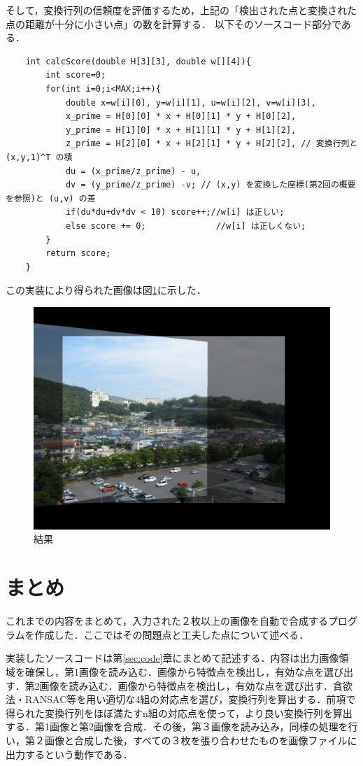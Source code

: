 \documentclass[11pt]{jarticle}
\begin{document}
そして，変換行列の信頼度を評価するため，上記の「検出された点と変換された点の距離が十分に小さい点」の数を計算する．
以下そのソースコード部分である．
\begin{verbatim}
    int calcScore(double H[3][3], double w[][4]){
        int score=0;
        for(int i=0;i<MAX;i++){
            double x=w[i][0], y=w[i][1], u=w[i][2], v=w[i][3],
            x_prime = H[0][0] * x + H[0][1] * y + H[0][2],
            y_prime = H[1][0] * x + H[1][1] * y + H[1][2],
            z_prime = H[2][0] * x + H[2][1] * y + H[2][2], // 変換行列と (x,y,1)^T の積
            du = (x_prime/z_prime) - u,
            dv = (y_prime/z_prime) -v; // (x,y) を変換した座標(第2回の概要を参照)と (u,v) の差
            if(du*du+dv*dv < 10) score++;//w[i] は正しい;
            else score += 0;              //w[i] は正しくない;
        }
        return score;
    }    
\end{verbatim}

この実装により得られた画像は図\ref{7-1.jpg}に示した．

\begin{figure}[ht]
    \centering
    \includegraphics[scale=.5]{7-1.jpg}
    \caption{結果}
    \label{7-1.jpg}
\end{figure}

\section{まとめ}
これまでの内容をまとめて，入力された２枚以上の画像を自動で合成するプログラムを作成した．ここではその問題点と工夫した点について述べる．


実装したソースコードは第\ref{sec:code}章にまとめて記述する．内容は出力画像領域を確保し，第1画像を読み込む．画像から特徴点を検出し，有効な点を選び出す．第2画像を読み込む．画像から特徴点を検出し，有効な点を選び出す．貪欲法・RANSAC等を用い適切な4組の対応点を選び，変換行列を算出する．前項で得られた変換行列をほぼ満たすn組の対応点を使って，より良い変換行列を算出する．第1画像と第2画像を合成．その後，第３画像を読み込み，同様の処理を行い，第２画像と合成した後，すべての３枚を張り合わせたものを画像ファイルに出力するという動作である．
\end{document}
